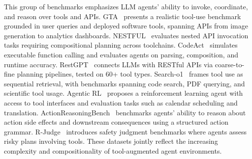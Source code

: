 This group of benchmarks emphasizes LLM agents' ability to invoke, coordinate, and reason over tools and APIs. GTA~\cite{jize2024gta} presents a realistic tool-use benchmark grounded in user queries and deployed software tools, spanning APIs from image generation to analytics dashboards. NESTFUL~\cite{kinjal2024nestful} evaluates nested API invocation tasks requiring compositional planning across toolchains. CodeAct~\cite{wang2024executable} simulates executable function calling and evaluates agents on parsing, composition, and runtime accuracy. RestGPT~\cite{song2023restgpt} connects LLMs with RESTful APIs via coarse-to-fine planning pipelines, tested on 60+ tool types. Search-o1~\cite{li2025search} frames tool use as sequential retrieval, with benchmarks spanning code search, PDF querying, and scientific tool usage. Agentic RL~\cite{joykirat2025agentic} proposes a reinforcement learning agent with access to tool interfaces and evaluation tasks such as calendar scheduling and translation. ActionReasoningBench~\cite{divij2024actionreasoningbench} benchmarks agents’ ability to reason about action side effects and downstream consequences using a structured action grammar. R-Judge~\cite{tongxin2024rjudge} introduces safety judgment benchmarks where agents assess risky plans involving tools. These datasets jointly reflect the increasing complexity and compositionality of tool-augmented agent environments.
